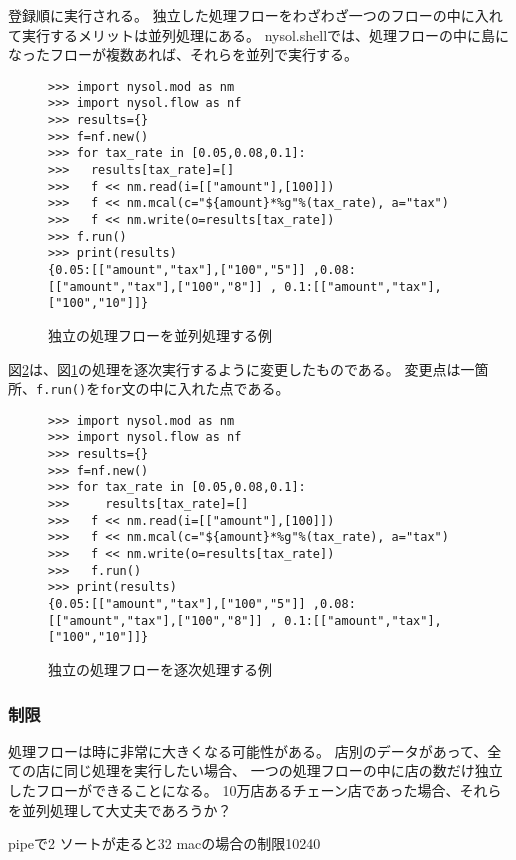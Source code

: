 登録順に実行される。
独立した処理フローをわざわざ一つのフローの中に入れて実行するメリットは並列処理にある。
nysol.shellでは、処理フローの中に島になったフローが複数あれば、それらを並列で実行する。

\begin{figure}[htbp]
\begin{Verbatim}[baselinestretch=0.7,frame=single]
>>> import nysol.mod as nm
>>> import nysol.flow as nf
>>> results={}
>>> f=nf.new()
>>> for tax_rate in [0.05,0.08,0.1]:
>>>   results[tax_rate]=[]
>>>   f << nm.read(i=[["amount"],[100]])
>>>   f << nm.mcal(c="${amount}*%g"%(tax_rate), a="tax")
>>>   f << nm.write(o=results[tax_rate])
>>> f.run()
>>> print(results)
{0.05:[["amount","tax"],["100","5"]] ,0.08:[["amount","tax"],["100","8"]] , 0.1:[["amount","tax"],["100","10"]]}
\end{Verbatim}
\caption{独立の処理フローを並列処理する例\label{code:flow_para1}}
\end{figure}

図\ref{code:flow_para2}は、図\ref{code:flow_para1}の処理を逐次実行するように変更したものである。
変更点は一箇所、\verb|f.run()|を\verb|for|文の中に入れた点である。

\begin{figure}[htbp]
\begin{Verbatim}[baselinestretch=0.7,frame=single]
>>> import nysol.mod as nm
>>> import nysol.flow as nf
>>> results={}
>>> f=nf.new()
>>> for tax_rate in [0.05,0.08,0.1]:
>>> 	results[tax_rate]=[]
>>>   f << nm.read(i=[["amount"],[100]])
>>>   f << nm.mcal(c="${amount}*%g"%(tax_rate), a="tax")
>>>   f << nm.write(o=results[tax_rate])
>>>   f.run()
>>> print(results)
{0.05:[["amount","tax"],["100","5"]] ,0.08:[["amount","tax"],["100","8"]] , 0.1:[["amount","tax"],["100","10"]]}
\end{Verbatim}
\caption{独立の処理フローを逐次処理する例\label{code:flow_para2}}
\end{figure}

\subsubsection{制限}
処理フローは時に非常に大きくなる可能性がある。
店別のデータがあって、全ての店に同じ処理を実行したい場合、
一つの処理フローの中に店の数だけ独立したフローができることになる。
10万店あるチェーン店であった場合、それらを並列処理して大丈夫であろうか？

pipeで2
ソートが走ると32
macの場合の制限10240


%

